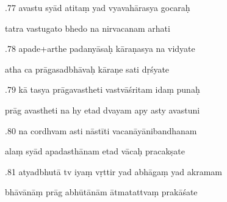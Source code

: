 \documentclass[article,12pt,a4paper]{memoir}%
\newcounter{parCount}
\begin{document}
	  
	  \pstart {}.77 avastu syād atitaṃ yad vyavahārasya gocaraḥ 
	{}
	\pend%
      

	  
	  \pstart \leavevmode%
	tatra vastugato bhedo na nirvacanam arhati 
	{}
	\pend%
      

	  
	  \pstart {}.78 apade+arthe padanyāsaḥ kāraṇasya na vidyate 
	{}
	\pend%
      

	  
	  \pstart \leavevmode%
	atha ca prāgasadbhāvaḥ kāraṇe sati dṛśyate 
	{}
	\pend%
      

	  
	  \pstart {}.79 kā tasya prāgavastheti vastvāśritam idaṃ punaḥ 
	{}
	\pend%
      

	  
	  \pstart \leavevmode%
	prāg avastheti na hy etad dvayam apy asty avastuni 
	{}
	\pend%
      

	  
	  \pstart {}.80 na cordhvam asti nāstīti vacanāyānibandhanam 
	{}
	\pend%
      

	  
	  \pstart \leavevmode%
	alaṃ syād apadasthānam etad vācaḥ pracakṣate 
	{}
	\pend%
      

	  
	  \pstart {}.81 atyadbhutā tv iyaṃ vṛttir yad abhāgaṃ yad akramam 
	{}
	\pend%
      

	  
	  \pstart \leavevmode%
	bhāvānāṃ prāg abhūtānām ātmatattvaṃ prakāśate 
	{}
	\pend%
      
\end{document}
